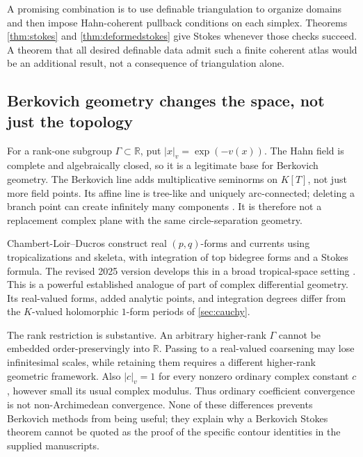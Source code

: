 \documentclass[11pt,letterpaper]{article}
\theoremstyle{definition}
\theoremstyle{remark}
\newcommand{\R}{\mathbb R}\newcommand{\C}{\mathbb C}\newcommand{\Q}{\mathbb Q}
\numberwithin{equation}{section}
\begin{document}
A promising combination is to use definable triangulation to organize domains and then impose Hahn-coherent pullback conditions on each simplex. Theorems \ref{thm:stokes} and \ref{thm:deformedstokes} give Stokes whenever those checks succeed. A theorem that all desired definable data admit such a finite coherent atlas would be an additional result, not a consequence of triangulation alone.

\subsection{Berkovich geometry changes the space, not just the topology}
For a rank-one subgroup $\Gamma\subset\R$, put $|x|_v=\exp(-v(x))$. The Hahn field is complete and algebraically closed, so it is a legitimate base for Berkovich geometry. The Berkovich line adds multiplicative seminorms on $K[T]$, not just more field points. Its affine line is tree-like and uniquely arc-connected; deleting a branch point can create infinitely many components \cite[\S2.3.3]{Temkin}. It is therefore not a replacement complex plane with the same circle-separation geometry.

Chambert-Loir--Ducros construct real $(p,q)$-forms and currents using tropicalizations and skeleta, with integration of top bidegree forms and a Stokes formula. The revised 2025 version develops this in a broad tropical-space setting \cite{CLD}. This is a powerful established analogue of part of complex differential geometry. Its real-valued forms, added analytic points, and integration degrees differ from the $K$-valued holomorphic $1$-form periods of \cref{sec:cauchy}.

The rank restriction is substantive. An arbitrary higher-rank $\Gamma$ cannot be embedded order-preservingly into $\R$. Passing to a real-valued coarsening may lose infinitesimal scales, while retaining them requires a different higher-rank geometric framework. Also $|c|_v=1$ for every nonzero ordinary complex constant $c$, however small its usual complex modulus. Thus ordinary coefficient convergence is not non-Archimedean convergence. None of these differences prevents Berkovich methods from being useful; they explain why a Berkovich Stokes theorem cannot be quoted as the proof of the specific contour identities in the supplied manuscripts.
\end{document}
